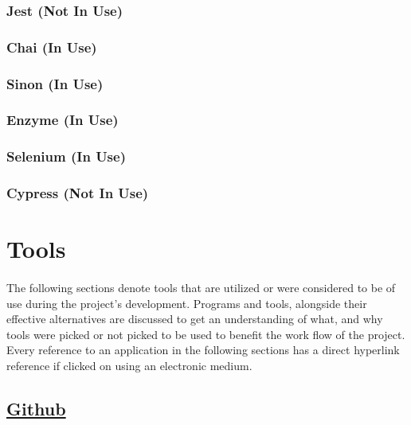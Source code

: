 \documentclass[12pt]{article}
\begin{document}
\subsubsection{Jest (Not In Use)}

\subsubsection{Chai (In Use)}

\subsubsection{Sinon (In Use)}

\subsubsection{Enzyme (In Use)}

\subsubsection{Selenium (In Use)}

\subsubsection{Cypress (Not In Use)}



\newpage

\section{Tools}
\paragraph{}	The following sections denote tools that are utilized or were considered to be of use during the project's development. Programs and tools, alongside their effective alternatives are discussed to get an understanding of what, and why tools were picked or not picked to be used to benefit the work flow of the project. Every reference to an application in the following sections has a direct hyperlink reference if clicked on using an electronic medium.

\subsection{\href{https://Github.com}{Github}}
\end{document}

